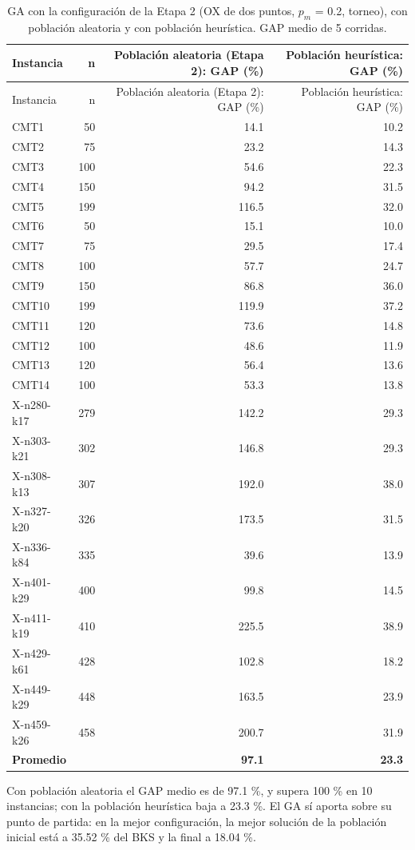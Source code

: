 \documentclass[11pt,letterpaper]{article}
\begin{document}
\begin{longtable}[]{@{}lrrr@{}}
\caption{GA con la configuración de la Etapa 2 (OX de dos puntos, \(p_{m}\) = 0.2, torneo), con población aleatoria y con población heurística. GAP medio de 5 corridas.}\tabularnewline
\toprule\noalign{}
Instancia & n & Población aleatoria (Etapa 2): GAP (\%) & Población heurística: GAP (\%) \\
\midrule\noalign{}
\endfirsthead
\toprule\noalign{}
Instancia & n & Población aleatoria (Etapa 2): GAP (\%) & Población heurística: GAP (\%) \\
\midrule\noalign{}
\endhead
\bottomrule\noalign{}
\endlastfoot
CMT1 & 50 & 14.1 & 10.2 \\
CMT2 & 75 & 23.2 & 14.3 \\
CMT3 & 100 & 54.6 & 22.3 \\
CMT4 & 150 & 94.2 & 31.5 \\
CMT5 & 199 & 116.5 & 32.0 \\
CMT6 & 50 & 15.1 & 10.0 \\
CMT7 & 75 & 29.5 & 17.4 \\
CMT8 & 100 & 57.7 & 24.7 \\
CMT9 & 150 & 86.8 & 36.0 \\
CMT10 & 199 & 119.9 & 37.2 \\
CMT11 & 120 & 73.6 & 14.8 \\
CMT12 & 100 & 48.6 & 11.9 \\
CMT13 & 120 & 56.4 & 13.6 \\
CMT14 & 100 & 53.3 & 13.8 \\
X-n280-k17 & 279 & 142.2 & 29.3 \\
X-n303-k21 & 302 & 146.8 & 29.3 \\
X-n308-k13 & 307 & 192.0 & 38.0 \\
X-n327-k20 & 326 & 173.5 & 31.5 \\
X-n336-k84 & 335 & 39.6 & 13.9 \\
X-n401-k29 & 400 & 99.8 & 14.5 \\
X-n411-k19 & 410 & 225.5 & 38.9 \\
X-n429-k61 & 428 & 102.8 & 18.2 \\
X-n449-k29 & 448 & 163.5 & 23.9 \\
X-n459-k26 & 458 & 200.7 & 31.9 \\
\textbf{Promedio} & & \textbf{97.1} & \textbf{23.3} \\
\end{longtable}

Con población aleatoria el GAP medio es de 97.1 \%, y supera 100 \% en 10 instancias; con la población heurística baja a 23.3 \%. El GA sí aporta sobre su punto de partida: en la mejor configuración, la mejor solución de la población inicial está a 35.52 \% del BKS y la final a 18.04 \%.
\end{document}
